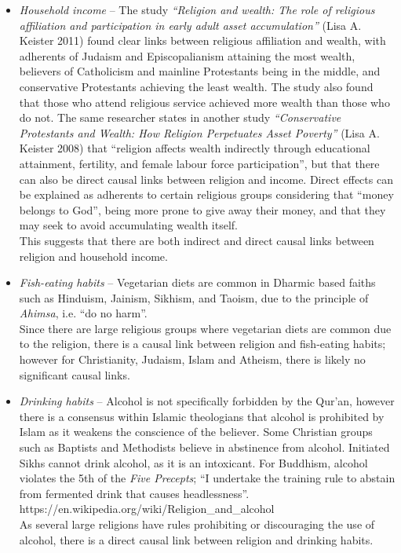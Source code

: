 \begin{itemize}
\begin{itemize}
\item \textit{Household income} -- The study \textit{``Religion and wealth: The role of religious affiliation and participation in early adult asset accumulation''} (Lisa A. Keister 2011) found clear links between religious affiliation and wealth, with adherents of Judaism and Episcopalianism attaining the most wealth, believers of Catholicism and mainline Protestants being in the middle, and conservative Protestants achieving the least wealth. The study also found that those who attend religious service achieved more wealth than those who do not. The same researcher states in another study \textit{``Conservative Protestants and Wealth: How Religion Perpetuates Asset Poverty''} (Lisa A. Keister 2008) that ``religion affects wealth indirectly through educational attainment, fertility, and female labour force participation'', but that there can also be direct causal links between religion and income. Direct effects can be explained as adherents to certain religious groups considering that ``money belongs to God'', being more prone to give away their money, and that they may seek to avoid accumulating wealth itself.\\This suggests that there are both indirect and direct causal links between religion and household income.
\item \textit{Fish-eating habits} -- Vegetarian diets are common in Dharmic based faiths such as Hinduism, Jainism, Sikhism, and Taoism, due to the principle of \textit{Ahimsa}, i.e. ``do no harm''.\\
Since there are large religious groups where vegetarian diets are common due to the religion, there is a causal link between religion and fish-eating habits; however for Christianity, Judaism, Islam and Atheism, there is likely no significant causal links.
    \item \textit{Drinking habits} -- Alcohol is not specifically forbidden by the Qur'an, however there is a consensus within Islamic theologians that alcohol is prohibited by Islam as it weakens the conscience of the believer. Some Christian groups such as Baptists and Methodists believe in abstinence from alcohol. Initiated Sikhs cannot drink alcohol, as it is an intoxicant. For Buddhism, alcohol violates the 5th of the \textit{Five Precepts}; ``I undertake the training rule to abstain from fermented drink that causes headlessness''.\\https://en.wikipedia.org/wiki/Religion\_and\_alcohol\\As several large religions have rules prohibiting or discouraging the use of alcohol, there is a direct causal link between religion and drinking habits.
\end{itemize}
\end{itemize}



